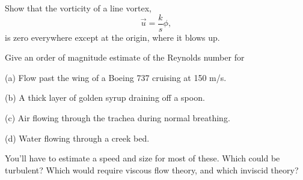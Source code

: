 \begin{problem}
\label{prob_vortex_vorticity}
Show that the vorticity of a line vortex, 
\[
\vec{u} = \frac{k}{s} \unit{\phi},
\]
is zero everywhere except at the origin, where it blows up.
\end{problem}



\begin{problem} Give an order of magnitude estimate of the Reynolds number for

(a) Flow past the wing of a Boeing 737 cruising at 150 m/s.

(b) A thick layer of golden syrup draining off a spoon.

(c) Air flowing through the trachea during normal breathing.

(d) Water flowing through a creek bed.

You'll have to estimate a speed and size for most of these.  Which could be turbulent?  Which would require viscous flow theory, and which inviscid theory?

\end{problem}
